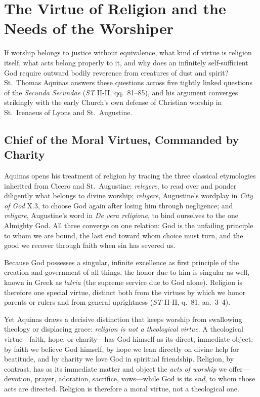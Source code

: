 \section{The Virtue of Religion and the Needs of the Worshiper}

If worship belongs to justice without equivalence, what kind of virtue is religion itself, what acts belong properly to it, and why does an infinitely self-sufficient God require outward bodily reverence from creatures of dust and spirit? St.\ Thomas Aquinas answers these questions across five tightly linked questions of the \emph{Secunda Secundae} (\emph{ST} II-II, qq.\ 81--85), and his argument converges strikingly with the early Church's own defense of Christian worship in St.\ Irenaeus of Lyons and St.\ Augustine.

\subsection{Chief of the Moral Virtues, Commanded by Charity}

Aquinas opens his treatment of religion by tracing the three classical etymologies inherited from Cicero and St.\ Augustine: \emph{relegere}, to read over and ponder diligently what belongs to divine worship; \emph{religere}, Augustine's wordplay in \emph{City of God} X.3, to choose God again after losing him through negligence; and \emph{religare}, Augustine's word in \emph{De vera religione}, to bind ourselves to the one Almighty God. All three converge on one relation: God is the unfailing principle to whom we are bound, the last end toward whom choice must turn, and the good we recover through faith when sin has severed us.

Because God possesses a singular, infinite excellence as first principle of the creation and government of all things, the honor due to him is singular as well, known in Greek as \emph{latria} (the supreme service due to God alone). Religion is therefore one special virtue, distinct both from the virtues by which we honor parents or rulers and from general uprightness (\emph{ST} II-II, q.\ 81, aa.\ 3--4).

Yet Aquinas draws a decisive distinction that keeps worship from swallowing theology or displacing grace: \emph{religion is not a theological virtue}. A theological virtue---faith, hope, or charity---has God himself as its direct, immediate object: by faith we believe God himself, by hope we lean directly on divine help for beatitude, and by charity we love God in spiritual friendship. Religion, by contrast, has as its immediate matter and object the \emph{acts of worship} we offer---devotion, prayer, adoration, sacrifice, vows---while God is its \emph{end}, to whom those acts are directed. Religion is therefore a moral virtue, not a theological one.


